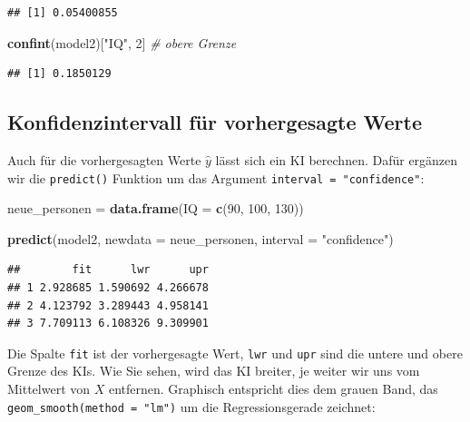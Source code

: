 \documentclass[
]{book}
\newenvironment{Shaded}{\begin{snugshade}}{\end{snugshade}}
\newcommand{\AttributeTok}[1]{\textcolor[rgb]{0.13,0.29,0.53}{#1}}
\newcommand{\CommentTok}[1]{\textcolor[rgb]{0.56,0.35,0.01}{\textit{#1}}}
\newcommand{\DecValTok}[1]{\textcolor[rgb]{0.00,0.00,0.81}{#1}}
\newcommand{\FunctionTok}[1]{\textcolor[rgb]{0.13,0.29,0.53}{\textbf{#1}}}
\newcommand{\NormalTok}[1]{#1}
\newcommand{\OtherTok}[1]{\textcolor[rgb]{0.56,0.35,0.01}{#1}}
\newcommand{\StringTok}[1]{\textcolor[rgb]{0.31,0.60,0.02}{#1}}
\begin{document}
\begin{verbatim}
## [1] 0.05400855
\end{verbatim}

\begin{Shaded}
\begin{Highlighting}[]
\FunctionTok{confint}\NormalTok{(model2)[}\StringTok{"IQ"}\NormalTok{, }\DecValTok{2}\NormalTok{] }\CommentTok{\# obere Grenze}
\end{Highlighting}
\end{Shaded}

\begin{verbatim}
## [1] 0.1850129
\end{verbatim}

\subsection{Konfidenzintervall für vorhergesagte Werte}\label{konfidenzintervall-fuxfcr-vorhergesagte-werte}

Auch für die vorhergesagten Werte \(\hat{y}\) lässt sich ein KI berechnen. Dafür ergänzen wir die \texttt{predict()} Funktion um das Argument \texttt{interval\ =\ "confidence"}:

\begin{Shaded}
\begin{Highlighting}[]
\NormalTok{neue\_personen }\OtherTok{=} \FunctionTok{data.frame}\NormalTok{(}\AttributeTok{IQ =} \FunctionTok{c}\NormalTok{(}\DecValTok{90}\NormalTok{, }\DecValTok{100}\NormalTok{, }\DecValTok{130}\NormalTok{))}

\FunctionTok{predict}\NormalTok{(model2, }\AttributeTok{newdata =}\NormalTok{ neue\_personen, }\AttributeTok{interval =} \StringTok{"confidence"}\NormalTok{)}
\end{Highlighting}
\end{Shaded}

\begin{verbatim}
##        fit      lwr      upr
## 1 2.928685 1.590692 4.266678
## 2 4.123792 3.289443 4.958141
## 3 7.709113 6.108326 9.309901
\end{verbatim}

Die Spalte \texttt{fit} ist der vorhergesagte Wert, \texttt{lwr} und \texttt{upr} sind die untere und obere Grenze des KIs. Wie Sie sehen, wird das KI breiter, je weiter wir uns vom Mittelwert von \(X\) entfernen. Graphisch entspricht dies dem grauen Band, das \texttt{geom\_smooth(method\ =\ "lm")} um die Regressionsgerade zeichnet:
\end{document}
